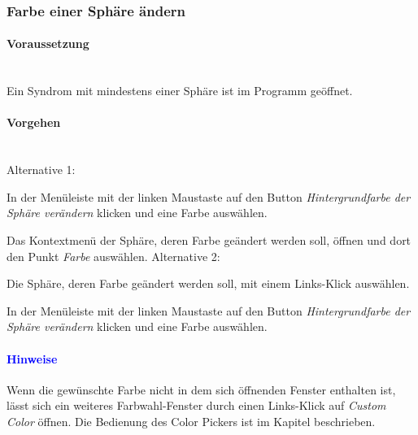 \documentclass[enabledeprecatedfontcommands,fontsize=11pt,paper=a4,twoside]{scrartcl}
\newcounter{one}
\newcounter{two}[one]
\newcommand*{\hint}{\paragraph{\textcolor{blue}{Hinweise}}}
\newcommand*{\condition}{\paragraph{Voraussetzung}$\;$ \vspace{0.2cm}\\}
\newcommand*{\actions}{\paragraph{Vorgehen} $\;$\vspace{0.2cm}\\}
\newcommand*{\aOne}{\textcolor{bbe}{Alternative 1:}}
\newcommand*{\aTwo}{\textcolor{bbe}{Alternative 2:}}
\let\tempone\itemize
\let\temptwo\enditemize
\renewenvironment{itemize}{\tempone\addtolength{\itemsep}{-10.0pt}}{\temptwo}
\let\origenumerate\enumerate
\let\origendenumerate\endenumerate
\renewenvironment{enumerate}{\origenumerate \addtolength{\itemsep}{-10.0pt}}{\origendenumerate}
\begin{document}
\subsubsection{Farbe einer Sphäre ändern}
		\condition 	
		Ein Syndrom mit mindestens einer Sphäre ist im Programm geöffnet. 
		\actions  
		\aOne
		\begin{enumerate}
			\item In der Menüleiste mit der linken Maustaste auf den Button \textit{Hintergrundfarbe der Sphäre verändern} klicken und eine Farbe auswählen.
			\item Das Kontextmenü der Sphäre, deren Farbe geändert werden soll, öffnen und dort den Punkt \textit{Farbe} auswählen.
		\end{enumerate}
		\aTwo
		\begin{enumerate}
			\item Die Sphäre, deren Farbe geändert werden soll, mit einem Links-Klick auswählen.
			\item In der Menüleiste mit der linken Maustaste auf den Button \textit{Hintergrundfarbe der Sphäre verändern} klicken und eine Farbe auswählen.
		\end{enumerate}
		\hint
		\begin{itemize}
			\item Wenn die gewünschte Farbe nicht in dem sich öffnenden Fenster enthalten ist, lässt sich ein weiteres Farbwahl-Fenster durch einen Links-Klick auf \textit{Custom Color} öffnen. Die Bedienung des Color Pickers ist im Kapitel  beschrieben.\\
	\end{itemize}	
	
\end{document}
